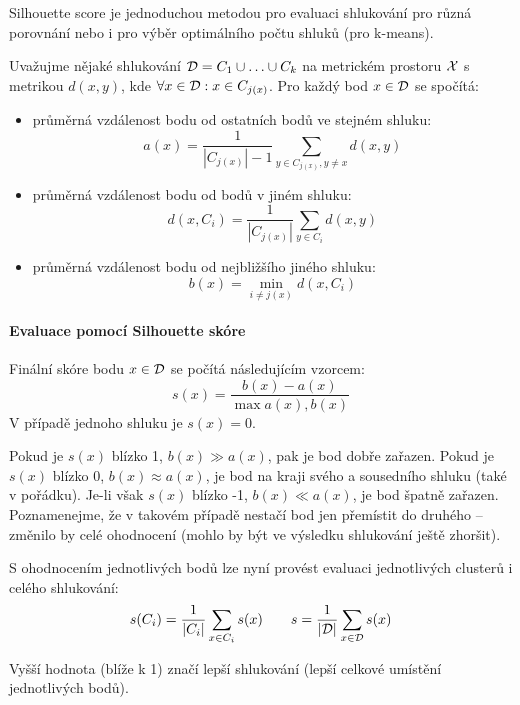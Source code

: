 \documentclass[../main.tex]{subfiles}
\begin{document}
Silhouette score je jednoduchou metodou pro evaluaci shlukování pro různá porovnání nebo i pro výběr optimálního počtu shluků (pro k-means).

Uvažujme nějaké shlukování $\mathcal{D} = C_1 \cup \ldots \cup C_k$ na metrickém prostoru $\mathcal{X}$ s metrikou $d(x, y)$, kde $\forall x \in \mathcal{D}: x \in C_{j(x)}$. Pro každý bod $x \in \mathcal{D}$ se spočítá:

\begin{itemize}

    \item průměrná vzdálenost bodu od ostatních bodů ve stejném shluku:
    \[
        a(x) = \frac{1}{|C_{j(x)}| - 1} \sum_{y \in C_{j(x)}, y \neq x} d(x, y)
    \]

    \item průměrná vzdálenost bodu od bodů v jiném shluku:
    \[
        d(x, C_i) = \frac{1}{|C_{j(x)}|} \sum_{y \in C_i} d(x, y)
    \]

    \item průměrná vzdálenost bodu od nejbližšího jiného shluku:
    \[
        b(x) = \min_{i \neq j(x)} d(x, C_i)
    \]

\end{itemize}

\paragraph{Evaluace pomocí Silhouette skóre}

Finální skóre bodu $x \in \mathcal{D}$ se počítá následujícím vzorcem:
\[
    s(x) = \frac{b(x) - a(x)}{\max {a(x), b(x)}}
\]
V případě jednoho shluku je $s(x) = 0$.

Pokud je $s(x)$ blízko 1, $b(x) \gg a(x)$, pak je bod dobře zařazen. Pokud je $s(x)$ blízko 0, $b(x) \approx a(x)$, je bod na kraji svého a sousedního shluku (také v pořádku). Je-li však $s(x)$ blízko -1, $b(x) \ll a(x)$, je bod špatně zařazen. Poznamenejme, že v takovém případě nestačí bod jen přemístit do druhého -- změnilo by celé ohodnocení (mohlo by být ve výsledku shlukování ještě zhoršit).

S ohodnocením jednotlivých bodů lze nyní provést evaluaci jednotlivých clusterů i celého shlukování:
\[
    s(C_i) = \frac{1}{|C_i|} \sum_{x \in C_i} s(x)
    \qquad
    s = \frac{1}{|\mathcal{D}|} \sum_{x \in \mathcal{D}} s(x)
\]

Vyšší hodnota (blíže k 1) značí lepší shlukování (lepší celkové umístění jednotlivých bodů).
\end{document}
